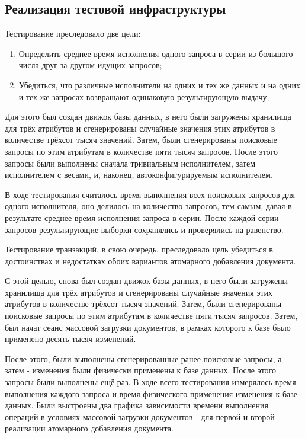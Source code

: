 \documentclass{matmex-diploma}
\begin{document}
    \subsection{Реализация тестовой инфраструктуры}
        Тестирование преследовало две цели:
            \begin{enumerate}
                \item Определить среднее время исполнения одного запроса в серии из большого числа друг за другом идущих запросов;
                \item Убедиться, что различные исполнители на одних и тех же данных и на одних и тех же запросах возвращают одинаковую результирующую выдачу; 
            \end{enumerate}
            
        Для этого был создан движок базы данных, в него были загружены хранилища для трёх атрибутов и сгенерированы случайные значения этих атрибутов в количестве трёхсот тысяч значений. Затем, были сгенерированы поисковые запросы по этим атрибутам в количестве пяти тысяч запросов. После этого запросы были выполнены сначала тривиальным исполнителем, затем исполнителем с весами, и, наконец, автоконфигурируемым исполнителем. 
            
        В ходе тестирования считалось время выполнения всех поисковых запросов для одного исполнителя, оно делилось на количество запросов, тем самым, давая в результате среднее время исполнения запроса в серии. После каждой серии запросов результирующие выборки сохранялись и проверялись на равенство.
        
        Тестирование транзакций, в свою очередь, преследовало цель убедиться в достоинствах и недостатках обоих вариантов атомарного добавления документа.
        
        С этой целью, снова был создан движок базы данных, в него были загружены хранилища для трёх атрибутов и сгенерированы случайные значения этих атрибутов в количестве трёхсот тысяч значений. Затем, были сгенерированы поисковые запросы по этим атрибутам в количестве пяти тысяч запросов. Затем, был начат сеанс массовой загрузки документов, в рамках которого к базе было применено десять тысяч изменений.
        
        После этого, были выполнены сгенерированные ранее поисковые запросы, а затем - изменения были физически применены к базе данных. После этого запросы были выполнены ещё раз. В ходе всего тестирования измерялось время выполнения каждого запроса и время физического применения изменения к базе данных. Были выстроены два графика зависимости времени выполнения операций в условиях массовой загрузки документов - для первой и второй реализации атомарного добавления документа.
\end{document}
